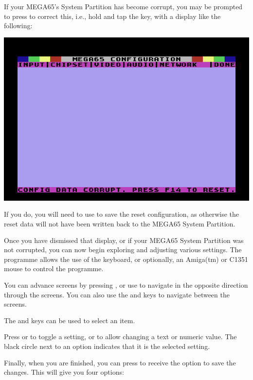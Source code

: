 If your MEGA65's System Partition has become corrupt, you may be
prompted to press  to correct this, i.e., hold  and tap
the  key, with a display like the following:

\includegraphics[width=\linewidth]{images/ss-m65config-corrupt.png}

If you do, you will
need to use  to save the reset configuration, as otherwise
the reset data will not have been written back to the MEGA65 System
Partition.

Once you have dismissed that display, or if your MEGA65 System
Partition was not corrupted, you can now begin exploring and adjusting
various settings.  The programme allows the use of the keyboard, or
optionally, an Amiga(tm) or C1351 mouse to control the programme.

You can advance screens by pressing , or use 
to navigate in the opposite direction through the screens. You can also
use the \megakey{$\leftarrow$} and \megakey{$\rightarrow$} keys to
navigate between the screens.

The
\megakey{$\uparrow$} and \megakey{$\downarrow$} keys can be used to
select an item.

Press  or  to toggle a setting, or to
allow changing a text or numeric value.  The black circle next to an
option indicates that it is the selected setting.

Finally, when you are finished, you can press  to receive the
option to save the changes. This will give you four options:  

